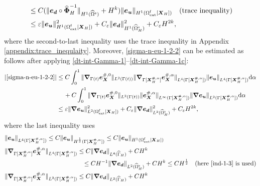 \documentclass[11pt,reqno]{amsart}
\theoremstyle{definition}
\theoremstyle{plain}
\numberwithin{theorem}{section}
\numberwithin{proposition}{section}
\numberwithin{lemma}{section}
\numberwithin{equation}{section}
\newcommand{\bs}[1]{\boldsymbol{#1}}
\newcommand{\uu}[1]  {{\bs{#1}} }
\newcommand{\dep}{{{\bs{d}}}}
\newcommand{\grad}   { \uu{\nabla}    }
\def\d{\mathrm{d}}
\renewcommand{\(}{\bigl(}
\renewcommand{\)}{\bigr)}
\begin{document}
\begin{itemize}[leftmargin=20pt]
\begin{align}
&\le C(\|{\bs e}_{\bs d}\circ\widehat{\bs\Phi}_H^{-1}\|_{H^1(\widehat\Omega^{\rm s})} + H^k)
    \|{\bs e}_{\bs u}\|_{H^1(\Omega^{\rm f}_{\rm ext}[{\bs X}_H])} 
\quad\mbox{(trace inequality)} \notag\\
&\le \varepsilon\|{\bs e}_{\bs u}\|_{H^1(\Omega^{\rm f}_{\rm ext}[{\bs X}_H])}^2 
     + C_{\varepsilon}\|{\bs e}_{\bs d}\|_{H^1(\widehat{\Omega}^{\rm s}_H)}^2 + C_{\varepsilon} H^{2k} ,
\end{align} 
where the second-to-last inequality uses the trace inequality in Appendix \ref{appendix:trace_inequlaity}. Moreover, \eqref{sigma-n-eu-1-2-2} can be estimated as follows after applying \eqref{dt-int-Gamma-1}--\eqref{dt-int-Gamma-1c}:
\begin{align}\label{sigma-n-eu-1-2-1e2}
|\eqref{sigma-n-eu-1-2-2}|
&\le C\int_0^1 \|\grad_{\Gamma(t)} {\bs e}_{\bs X}^{\#,0}\|_{L^2(\Gamma(t))} \|\grad_{\Gamma[{\bs X}_H^{\#,\alpha}]} {\bs e}_{\bs X}^{\#,\alpha}\|_{L^4(\Gamma[{\bs X}_H^{\#,\alpha}])} \|{\bs e}_{\bs u}\|_{L^4(\Gamma[{\bs X}_H^{\#,\alpha}])} \d\alpha\notag\\
&\quad\, 
+ C\int_0^1\|\grad_{\Gamma(t)} {\bs e}_{\bs X}^{\#,0}\|_{L^2(\Gamma(t))} \| {\bs e}_{\bs X}^{\#,\alpha}\|_{L^\infty(\Gamma[{\bs X}_H^{\#,\alpha}])} \|\grad {\bs e}_{\bs u}\|_{L^2(\Gamma[{\bs X}_H^{\#,\alpha}])} \d\alpha\notag\\
&\le 
\varepsilon\|\grad {\bs e}_{\bs u}\|_{L^2(\Omega^{\rm f}_{\rm ext}[{\bs X}_H])}^2
+ C_{\varepsilon} \|\grad {\bs e}_\dep \|_{L^2(\widehat{\Omega}^{\rm s}_H)}^2  + C_{\varepsilon} H^{2k} ,
\end{align}
where the last inequality uses 
\begin{align*}
&\|{\bs e}_{\bs u}\|_{L^4(\Gamma[{\bs X}_H^{\#,\alpha}])} 
\leq C\|{\bs e}_{\bs u}\|_{H^{\frac12}(\Gamma[{\bs X}_H^{\#,\alpha}])} 
\leq C\|{\bs e}_{\bs u}\|_{H^1(\Omega^{\rm f}_{\rm ext}[{\bs X}_H])} \notag\\ 
&\| \grad_{\Gamma[{\bs X}_H^{\#,\alpha}]}  {\bs e}_{\bs X}^{\#,\alpha}\|_{L^4(\Gamma[{\bs X}_H^{\#,\alpha}])} 
\le C\|\grad {\bs e}_{\bs d}\|_{L^4(\widehat\Gamma_H)} + CH^k \notag\\
&\hspace{125pt}\le CH^{-1}\|\grad {\bs e}_{\bs d}\|_{L^2(\widehat{\Omega}^{\rm s}_H)} + CH^k 
\le CH^{\frac12} \quad\mbox{(here \eqref{ind-1-3} is used)}\\
&\| \grad_{\Gamma[{\bs X}_H^{\#,\alpha}]}  {\bs e}_{\bs X}^{\#,\alpha}\|_{L^2(\Gamma[{\bs X}_H^{\#,\alpha}])} 
\le C\|\grad {\bs e}_{\bs d}\|_{L^2(\widehat\Gamma_H)} + CH^k 

\end{align*}
\end{itemize}
\end{document}
